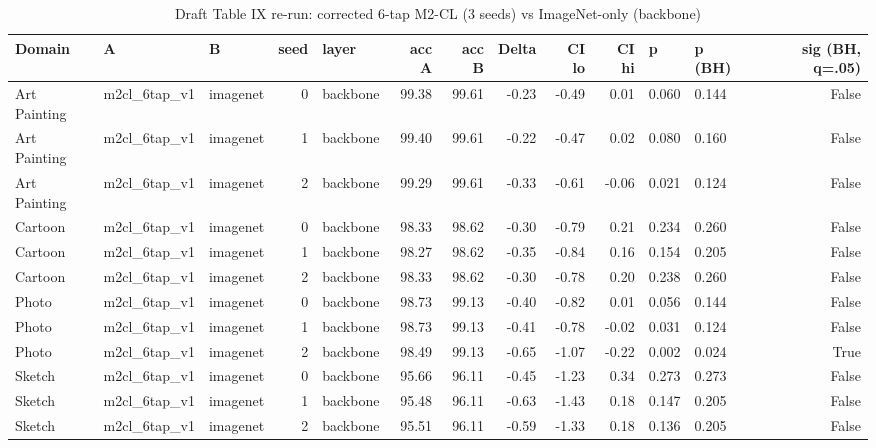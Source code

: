 \begin{table}
\caption{Draft Table IX re-run: corrected 6-tap M2-CL (3 seeds) vs ImageNet-only (backbone)}
\label{tab:leak_m2cl6_v1_vs_imagenet}
\begin{tabular}{lllrlrrrrrllr}
\toprule
Domain & A & B & seed & layer & acc A & acc B & Delta & CI lo & CI hi & p & p (BH) & sig (BH, q=.05) \\
\midrule
Art Painting & m2cl\_6tap\_v1 & imagenet & 0 & backbone & 99.38 & 99.61 & -0.23 & -0.49 & 0.01 & 0.060 & 0.144 & False \\
Art Painting & m2cl\_6tap\_v1 & imagenet & 1 & backbone & 99.40 & 99.61 & -0.22 & -0.47 & 0.02 & 0.080 & 0.160 & False \\
Art Painting & m2cl\_6tap\_v1 & imagenet & 2 & backbone & 99.29 & 99.61 & -0.33 & -0.61 & -0.06 & 0.021 & 0.124 & False \\
Cartoon & m2cl\_6tap\_v1 & imagenet & 0 & backbone & 98.33 & 98.62 & -0.30 & -0.79 & 0.21 & 0.234 & 0.260 & False \\
Cartoon & m2cl\_6tap\_v1 & imagenet & 1 & backbone & 98.27 & 98.62 & -0.35 & -0.84 & 0.16 & 0.154 & 0.205 & False \\
Cartoon & m2cl\_6tap\_v1 & imagenet & 2 & backbone & 98.33 & 98.62 & -0.30 & -0.78 & 0.20 & 0.238 & 0.260 & False \\
Photo & m2cl\_6tap\_v1 & imagenet & 0 & backbone & 98.73 & 99.13 & -0.40 & -0.82 & 0.01 & 0.056 & 0.144 & False \\
Photo & m2cl\_6tap\_v1 & imagenet & 1 & backbone & 98.73 & 99.13 & -0.41 & -0.78 & -0.02 & 0.031 & 0.124 & False \\
Photo & m2cl\_6tap\_v1 & imagenet & 2 & backbone & 98.49 & 99.13 & -0.65 & -1.07 & -0.22 & 0.002 & 0.024 & True \\
Sketch & m2cl\_6tap\_v1 & imagenet & 0 & backbone & 95.66 & 96.11 & -0.45 & -1.23 & 0.34 & 0.273 & 0.273 & False \\
Sketch & m2cl\_6tap\_v1 & imagenet & 1 & backbone & 95.48 & 96.11 & -0.63 & -1.43 & 0.18 & 0.147 & 0.205 & False \\
Sketch & m2cl\_6tap\_v1 & imagenet & 2 & backbone & 95.51 & 96.11 & -0.59 & -1.33 & 0.18 & 0.136 & 0.205 & False \\
\bottomrule
\end{tabular}
\end{table}

